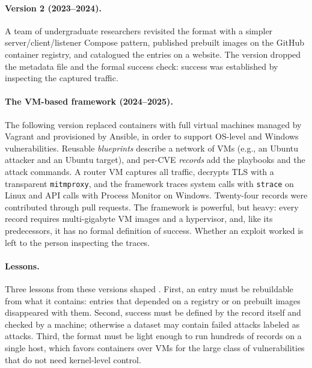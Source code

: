 \paragraph{Version 2 (2023--2024).}
A team of undergraduate researchers revisited the format with a simpler
server/client/listener Compose pattern, published prebuilt images on the
GitHub container registry, and catalogued the entries on a website. The
version dropped the metadata file and the formal success check: success was
established by inspecting the captured traffic.

\paragraph{The VM-based framework (2024--2025).}
The following version replaced containers with full virtual machines managed
by Vagrant and provisioned by Ansible, in order to support OS-level and
Windows vulnerabilities. Reusable \emph{blueprints} describe a network of
VMs (e.g., an Ubuntu attacker and an Ubuntu target), and per-CVE
\emph{records} add the playbooks and the attack commands. A router VM
captures all traffic, decrypts TLS with a transparent \texttt{mitmproxy},
and the framework traces system calls with \texttt{strace} on Linux and API
calls with Process Monitor on Windows. Twenty-four records were contributed
through pull requests. The framework is powerful, but heavy: every record
requires multi-gigabyte VM images and a hypervisor, and, like its
predecessors, it has no formal definition of success. Whether an exploit
worked is left to the person inspecting the traces.

\paragraph{Lessons.}
Three lessons from these versions shaped \cvexthree. First, an entry must be
rebuildable from what it contains: entries that depended on a registry or on
prebuilt images disappeared with them. Second, success must be defined by the
record itself and checked by a machine; otherwise a dataset may contain
failed attacks labeled as attacks. Third, the format must be light enough to
run hundreds of records on a single host, which favors containers over VMs
for the large class of vulnerabilities that do not need kernel-level control.
